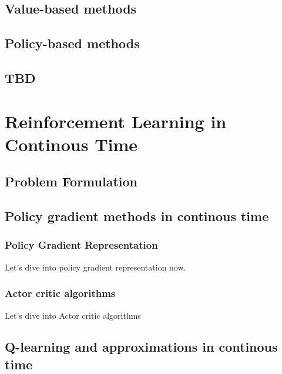 \documentclass[
  10,
  letterpaper,
  DIV=11,
  numbers=noendperiod]{scrreport}
\theoremstyle{definition}
\theoremstyle{definition}
\theoremstyle{plain}
\theoremstyle{remark}
\begin{document}
\subsection{Value-based methods}\label{value-based-methods}

\subsection{Policy-based methods}\label{policy-based-methods}

\subsection{TBD}\label{tbd}

\subsection{}\label{section}

\section{Reinforcement Learning in Continous
Time}\label{reinforcement-learning-in-continous-time}

\subsection{Problem Formulation}\label{problem-formulation}

\subsection{Policy gradient methods in continous
time}\label{policy-gradient-methods-in-continous-time}

\subsubsection{Policy Gradient
Representation}\label{policy-gradient-representation}

Let's dive into policy gradient representation now.

\subsubsection{Actor critic algorithms}\label{actor-critic-algorithms}

Let's dive into Actor critic algorithms

\subsection{Q-learning and approximations in continous
time}\label{q-learning-and-approximations-in-continous-time}
\end{document}
